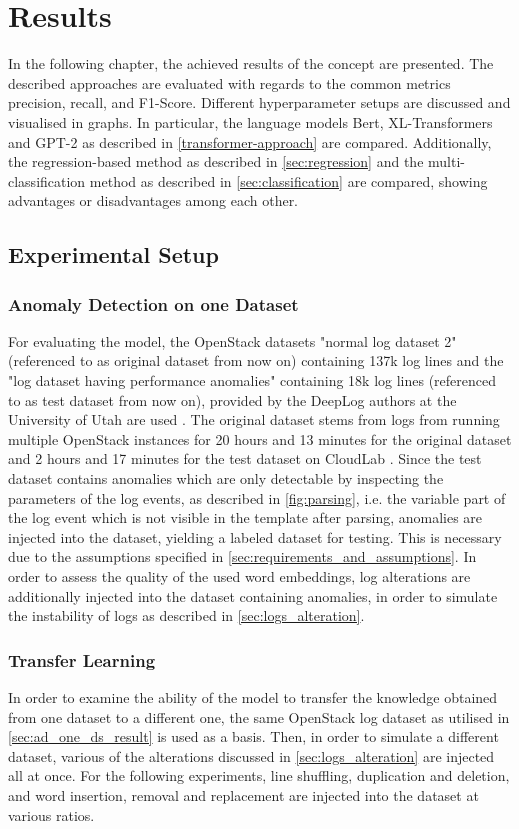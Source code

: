 \chapter{Results\label{cha:results}}

In the following chapter, the achieved results of the concept are presented. The described approaches are evaluated with regards to the common metrics precision, recall, and F1-Score. Different hyperparameter setups are discussed and visualised in graphs. In particular, the language models Bert, XL-Transformers and GPT-2 as described in \ref{transformer-approach} are compared. Additionally, the regression-based method as described in \ref{sec:regression} and the multi-classification method as described in \ref{sec:classification} are compared, showing advantages or disadvantages among each other.


\section{Experimental Setup}
\subsection{Anomaly Detection on one Dataset \label{sec:ad_one_ds_result}}
For evaluating the model, the OpenStack datasets "normal log dataset 2" (referenced to as original dataset from now on) containing 137k log lines and the "log dataset having performance anomalies" containing 18k log lines (referenced to as test dataset from now on), provided by the DeepLog authors at the University of Utah are used \cite{utah_dataset}. The original dataset stems from logs from running multiple OpenStack instances for 20 hours and 13 minutes for the original dataset and 2 hours and 17 minutes for the test dataset on CloudLab \cite{cloudlab}. Since the test dataset contains anomalies which are only detectable by inspecting the parameters of the log events, as described in \ref{fig:parsing}, i.e. the variable part of the log event which is not visible in the template after parsing, anomalies are injected into the dataset, yielding a labeled dataset for testing. This is necessary due to the assumptions specified in \ref{sec:requirements_and_assumptions}.
In order to assess the quality of the used word embeddings, log alterations are additionally injected into the dataset containing anomalies, in order to simulate the instability of logs as described in \ref{sec:logs_alteration}.
\subsection{Transfer Learning}
In order to examine the ability of the model to transfer the knowledge obtained from one dataset to a different one, the same OpenStack log dataset as utilised in \ref{sec:ad_one_ds_result} is used as a basis. Then, in order to simulate a different dataset, various of the alterations discussed in \ref{sec:logs_alteration} are injected all at once. For the following experiments, line shuffling, duplication and deletion, and word insertion, removal and replacement are injected into the dataset at various ratios.


